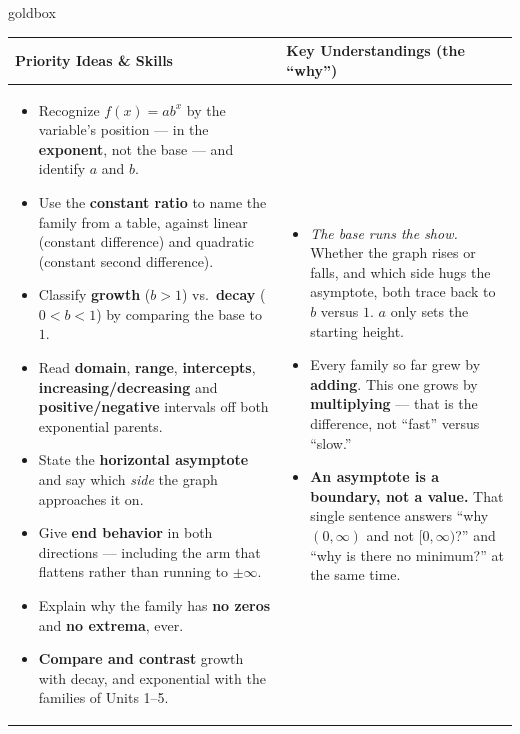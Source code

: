 \documentclass[10pt]{article}
\begin{document}
\renewcommand{\arraystretch}{1.4}
\begin{skillbox}{goldbox}
\begin{tabularx}{\linewidth}{@{}X|X@{}}
\textbf{Priority Ideas \& Skills} & \textbf{Key Understandings (the ``why'')} \\[2pt]
\hline
\vspace{-6pt}
\begin{itemize}[leftmargin=1.1em, nosep, after=\vspace{2pt}]
  \item Recognize $f(x)=ab^{x}$ by the variable's position --- in the \textbf{exponent}, not the base --- and identify $a$ and $b$.
  \item Use the \textbf{constant ratio} to name the family from a table, against linear (constant difference) and quadratic (constant second difference).
  \item Classify \textbf{growth} ($b>1$) vs.\ \textbf{decay} ($0<b<1$) by comparing the base to $1$.
  \item Read \textbf{domain}, \textbf{range}, \textbf{intercepts}, \textbf{increasing/decreasing} and \textbf{positive/negative} intervals off both exponential parents.
  \item State the \textbf{horizontal asymptote} and say which \emph{side} the graph approaches it on.
  \item Give \textbf{end behavior} in both directions --- including the arm that flattens rather than running to $\pm\infty$.
  \item Explain why the family has \textbf{no zeros} and \textbf{no extrema}, ever.
  \item \textbf{Compare and contrast} growth with decay, and exponential with the families of Units 1--5.
\end{itemize}
&
\vspace{-6pt}
\begin{itemize}[leftmargin=1.1em, nosep, after=\vspace{2pt}]
  \item \emph{The base runs the show.} Whether the graph rises or falls, and which side hugs the asymptote, both trace back to $b$ versus $1$. $a$ only sets the starting height.
  \item Every family so far grew by \textbf{adding}. This one grows by \textbf{multiplying} --- that is the difference, not ``fast'' versus ``slow.''
  \item \textbf{An asymptote is a boundary, not a value.} That single sentence answers ``why $(0,\infty)$ and not $[0,\infty)$?'' and ``why is there no minimum?'' at the same time.

\end{itemize}
\end{tabularx}
\end{skillbox}
\end{document}
